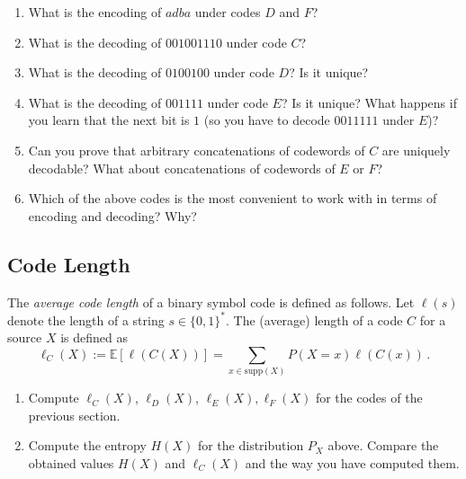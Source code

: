\documentclass[11p,a4paper]{article}
\begin{document}
\begin{enumerate}
\item What is the encoding of $adba$ under codes $D$ and $F$?
\item What is the decoding of $001001110$ under code $C$?
\item What is the decoding of $0100100$ under code $D$? Is it unique?
\item What is the decoding of $001111$ under code $E$? Is it unique?
  What happens if you learn that the next bit is $1$ (so you have to decode
  $0011111$ under $E$)?
\item Can you prove that arbitrary concatenations of codewords of $C$
  are uniquely decodable? What about concatenations of codewords of
  $E$ or $F$?
\item Which of the above codes is the most convenient to work with in
  terms of encoding and decoding? Why?
\end{enumerate}

\subsection{Code Length}
\newcommand{\len}{\ell}
 The \emph{average code length} of a binary symbol code is defined as follows.
Let $\len(s)$ denote the length of a string $s \in \{0,1\}^*$. The (average) length of a code $C$ for a source $X$ is defined as
\[
\len_C(X) := \mathbb{E}[\len(C(X))] = \sum_{x \in \mathrm{supp}(X)} P(X=x) \len(C(x)) \, .
\]
\begin{enumerate}
\item Compute $\len_C(X)$, $\len_D(X)$, $\len_E(X), \len_F(X)$ for the codes of the previous section.
\item Compute the entropy $H(X)$ for the distribution $P_X$ above.
  Compare the obtained values $H(X)$ and $\len_C(X)$ and the way you have computed them.
\end{enumerate}
\end{document}

